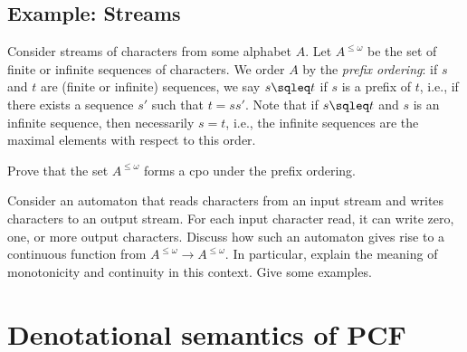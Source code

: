 \documentclass[12pt]{article}
\begin{document}
\subsection{Example: Streams}

Consider streams of characters from some alphabet $A$. Let
$A^{\leq\omega}$ be the set of finite or infinite sequences of
characters. We order $A$ by the {\em prefix ordering}: if $s$ and $t$
are (finite or infinite) sequences, we say $s\sqleq t$ if $s$ is a
prefix of $t$, i.e., if there exists a sequence $s'$ such that
$t=ss'$. Note that if $s\sqleq t$ and $s$ is an infinite sequence,
then necessarily $s=t$, i.e., the infinite sequences are the maximal
elements with respect to this order.

\begin{exercise}
  Prove that the set $A^{\leq\omega}$ forms a cpo under the prefix
  ordering.
\end{exercise}

\begin{exercise}
  Consider an automaton that reads characters from an input stream
  and writes characters to an output stream. For each input character
  read, it can write zero, one, or more output characters. Discuss how
  such an automaton gives rise to a continuous function from
  $A^{\leq\omega}\to A^{\leq\omega}$. In particular, explain the
  meaning of monotonicity and continuity in this context. Give some
  examples. 
\end{exercise}

\section{Denotational semantics of PCF}
\end{document}
